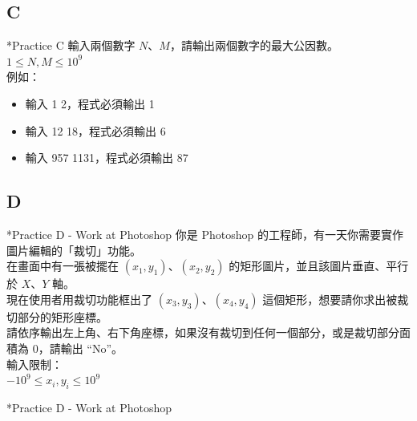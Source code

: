 \documentclass[t]{beamer}
\begin{document}
\subsection{C}
\begin{frame}{*Practice C}
  輸入兩個數字 $N$、$M$，請輸出兩個數字的最大公因數。\\
  \vspace{1em}
  $1\le N, M\le 10^{9}$\\
  \vspace{1em}
  例如：
  \begin{itemize}
    \item 輸入 1 2，程式必須輸出 1
    \item 輸入 12 18，程式必須輸出 6
    \item 輸入 957 1131，程式必須輸出 87
  \end{itemize}
\end{frame}

\subsection{D}
\begin{frame}{*Practice D - Work at Photoshop}
  你是 Photoshop 的工程師，有一天你需要實作圖片編輯的「裁切」功能。\\
  在畫面中有一張被擺在 $(x_{1},y_{1})$、$(x_{2},y_{2})$ 的矩形圖片，並且該圖片垂直、平行於 $X$、$Y$ 軸。\\
  現在使用者用裁切功能框出了 $(x_{3},y_{3})$、$(x_{4},y_{4})$ 這個矩形，想要請你求出被裁切部分的矩形座標。\\
  請依序輸出左上角、右下角座標，如果沒有裁切到任何一個部分，或是裁切部分面積為 $0$，請輸出 ``No''。\\
  \vspace{1em}
  輸入限制：\\
  $-10^{9}\le x_{i}, y_{i} \le 10^{9}$
\end{frame}

\begin{frame}{*Practice D - Work at Photoshop}
\end{frame}
\end{document}
